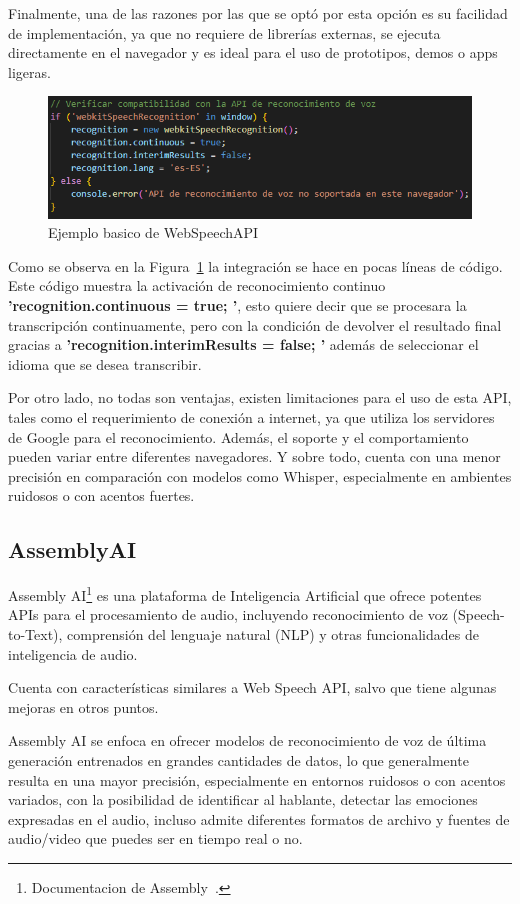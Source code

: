 \documentclass[a4paper, 12pt]{book}
\begin{document}
Finalmente, una de las razones por las que se optó por esta opción es su facilidad de implementación, ya que no requiere de librerías externas, se ejecuta directamente en el navegador y es ideal para el uso de prototipos, demos o apps ligeras.

\begin{figure}[H]
    \centering
    \includegraphics[width=0.8\linewidth]{img/WebKit.png}
    \caption{Ejemplo basico de WebSpeechAPI}
    \label{fig:WebKit}
\end{figure}

Como se observa en la Figura~\ref{fig:WebKit} la integración se hace en pocas líneas de código. Este código muestra la activación de reconocimiento continuo \textbf{'recognition.continuous = true; '}, esto quiere decir que se procesara la transcripción continuamente, pero con la condición de devolver el resultado final gracias a \textbf{'recognition.interimResults = false; '} además de seleccionar el idioma que se desea transcribir.

Por otro lado, no todas son ventajas, existen limitaciones para el uso de esta API, tales como el requerimiento de conexión a internet, ya que utiliza los servidores de Google para el reconocimiento. Además, el soporte y el comportamiento pueden variar entre diferentes navegadores. Y sobre todo, cuenta con una menor precisión en comparación con modelos como Whisper, especialmente en ambientes ruidosos o con acentos fuertes.


\subsection{AssemblyAI}

Assembly AI\footnote{Documentacion de Assembly~\cite{assemblyai_about}.} es una plataforma de Inteligencia Artificial que ofrece potentes APIs para el procesamiento de audio, incluyendo reconocimiento de voz (Speech-to-Text), comprensión del lenguaje natural (NLP) y otras funcionalidades de inteligencia de audio.

Cuenta con características similares a Web Speech API, salvo que tiene algunas mejoras en otros puntos.

Assembly AI se enfoca en ofrecer modelos de reconocimiento de voz de última generación entrenados en grandes cantidades de datos, lo que generalmente resulta en una mayor precisión, especialmente en entornos ruidosos o con acentos variados, con la posibilidad de identificar al hablante, detectar las emociones expresadas en el audio, incluso admite diferentes formatos de archivo y fuentes de audio/video que puedes ser en tiempo real o no.
\end{document}
